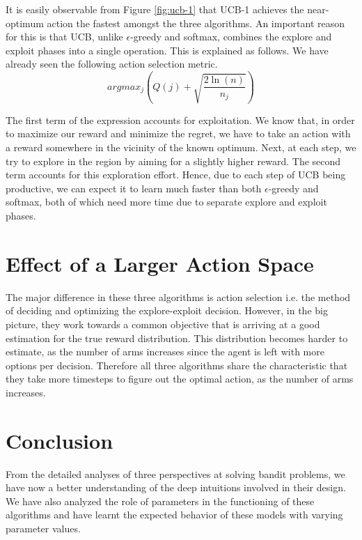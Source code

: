 \documentclass[12pt]{extarticle}
\begin{document}
It is easily observable from Figure \ref{fig:ucb-1} that UCB-1 achieves the near-optimum action the fastest amongst the three algorithms. An important reason for this is that UCB, unlike $\epsilon$-greedy and softmax, combines the explore and exploit phases into a single operation. This is explained as follows. We have already seen the following action selection metric.\\

\begin{equation*}
argmax_j \left(Q(j) + \sqrt{\frac{2\ln(n)}{n_j}}\right)
\end{equation*}

The first term of the expression accounts for exploitation. We know that, in order to maximize our reward and minimize the regret, we have to take an action with a reward somewhere in the vicinity of the known optimum. Next, at each step, we try to explore in the region by aiming for a slightly higher reward. The second term accounts for this exploration effort. Hence, due to each step of UCB being productive, we can expect it to learn much faster than both $\epsilon$-greedy and softmax, both of which need more time due to separate explore and exploit phases.\\

\section{Effect of a Larger Action Space}
The major difference in these three algorithms is action selection i.e. the method of deciding and optimizing the explore-exploit decision. However, in the big picture, they work towards a common objective that is arriving at a good estimation for the true reward distribution. This distribution becomes harder to estimate, as the number of arms increases since the agent is left with more options per decision. Therefore all three algorithms share the characteristic that they take more timesteps to figure out the optimal action, as the number of arms increases.

\section{Conclusion}
From the detailed analyses of three perspectives at solving bandit problems, we have now a better understanding of the deep intuitions involved in their design. We have also analyzed the role of parameters in the functioning of these algorithms and have learnt the expected behavior of these models with varying parameter values.\\



\end{document}
